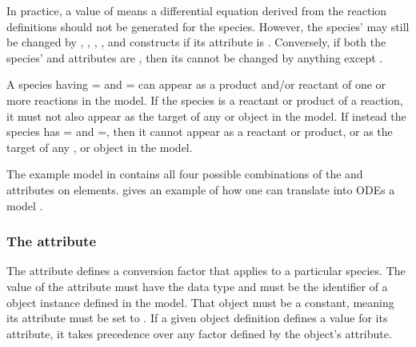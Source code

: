 In practice, a  value of  means
a differential equation derived from the reaction definitions
should not be generated for the species.  However, the species'
 may still be changed by \AssignmentRule, \RateRule,
\AlgebraicRule, \Event, and \InitialAssignment constructs if its
 attribute is .  Conversely, if both
the species'  and 
attributes are , then its  cannot be changed by
anything except \InitialAssignment.

A species having = and
= can appear as a product and/or
reactant of one or more reactions in the model.  If the species is
a reactant or product of a reaction, it must not also appear as
the target of any \AssignmentRule or \RateRule object in the
model.  If instead the species has
= and
=, then it cannot appear as a reactant
or product, or as the target of any \AssignmentRule, \RateRule or
\EventAssignment object in the model.

The example model in  contains
all four possible combinations of the 
and  attributes on  elements.
 gives an example of how one can translate
into ODEs a model .



\subsubsection{The  attribute}
\label{sec:species-conversion}

The attribute  defines a conversion factor
that applies to a particular species.  The value of the attribute
must have the data type  and must be the
identifier of a \Parameter object instance defined in the model.
That \Parameter object must be a constant, meaning its
 attribute must be set to .  If a given
\Species object definition defines a value for its
 attribute, it takes precedence over any
factor defined by the \Model object's 
attribute.


